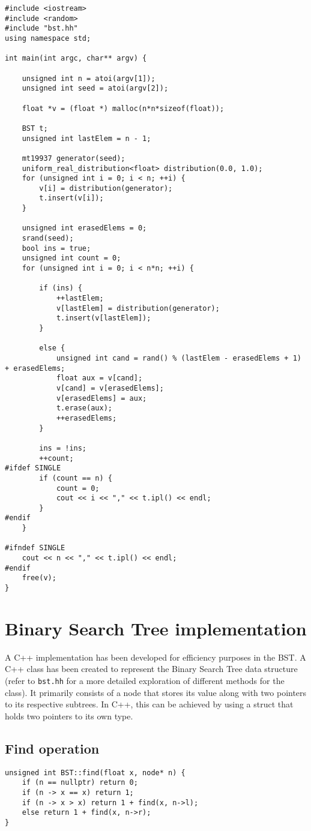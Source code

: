 \begin{verbatim}
#include <iostream>
#include <random>
#include "bst.hh"
using namespace std;

int main(int argc, char** argv) {

    unsigned int n = atoi(argv[1]);
    unsigned int seed = atoi(argv[2]);

    float *v = (float *) malloc(n*n*sizeof(float));

    BST t;
    unsigned int lastElem = n - 1;

    mt19937 generator(seed);
    uniform_real_distribution<float> distribution(0.0, 1.0);
    for (unsigned int i = 0; i < n; ++i) {
        v[i] = distribution(generator);
        t.insert(v[i]);
    }

    unsigned int erasedElems = 0;
    srand(seed);
    bool ins = true;
    unsigned int count = 0;
    for (unsigned int i = 0; i < n*n; ++i) {

        if (ins) {
            ++lastElem;
            v[lastElem] = distribution(generator);
            t.insert(v[lastElem]);
        }

        else {
            unsigned int cand = rand() % (lastElem - erasedElems + 1) + erasedElems;
            float aux = v[cand];
            v[cand] = v[erasedElems];
            v[erasedElems] = aux;
            t.erase(aux);
            ++erasedElems;
        }

        ins = !ins;
        ++count;
#ifdef SINGLE
        if (count == n) {
            count = 0;
            cout << i << "," << t.ipl() << endl;
        }
#endif
    }

#ifndef SINGLE
    cout << n << "," << t.ipl() << endl;
#endif
    free(v);
}
\end{verbatim}

\section{Binary Search Tree implementation}
A C++ implementation has been developed for efficiency purposes in the BST. A C++ class has been created to represent the Binary Search Tree data structure (refer to \texttt{bst.hh} for a more detailed exploration of different methods for the class). It primarily consists of a node that stores its value along with two pointers to its respective subtrees. In C++, this can be achieved by using a struct that holds two pointers to its own type.

\subsection{Find operation}
\begin{verbatim}
unsigned int BST::find(float x, node* n) {
    if (n == nullptr) return 0;
    if (n -> x == x) return 1;
    if (n -> x > x) return 1 + find(x, n->l);
    else return 1 + find(x, n->r);
}
\end{verbatim}

